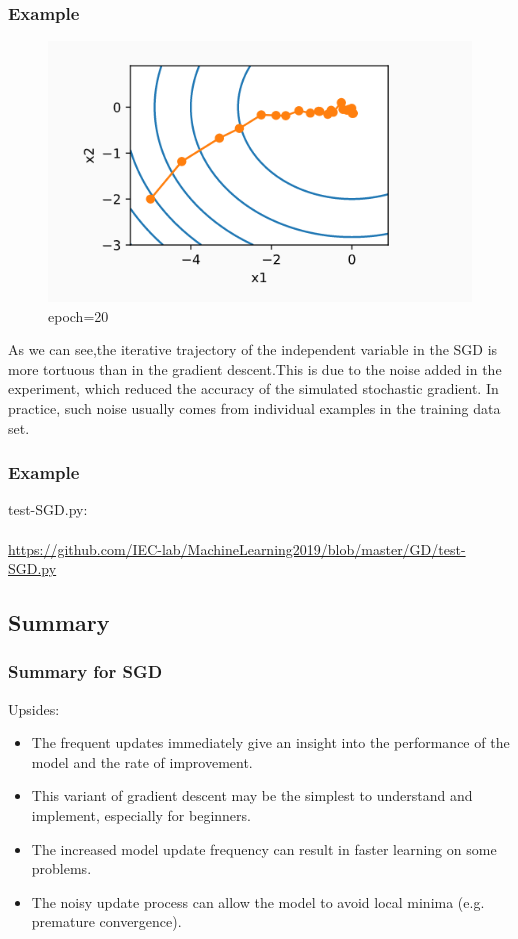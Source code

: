 \documentclass[cjk]{beamer}
\begin{document}
\begin{CJK*}{GBK}{kai}
\begin{frame}
\frametitle{Example}
\begin{figure}
\begin{minipage}[t]{\linewidth}
\centering
\includegraphics[width= .6\textwidth]{SGD.png}
\caption{epoch=20}
\end{minipage}
\end{figure}
As we can see,the iterative trajectory of the independent variable in the SGD is more tortuous than in the gradient descent.This is due to the noise added in the experiment, which reduced the accuracy of the simulated stochastic gradient. In practice, such noise usually comes from individual examples in the training data set.
\end{frame}

\begin{frame}
\frametitle{Example}
test-SGD.py:\\
~\\
\url{https://github.com/IEC-lab/MachineLearning2019/blob/master/GD/test-SGD.py}
\end{frame}

\subsection{Summary}
\begin{frame}
\frametitle{Summary for SGD}
Upsides:
\begin{itemize}
	\item The frequent updates immediately give an insight into the performance of the model and the rate of improvement.
	\item This variant of gradient descent may be the simplest to understand and implement, especially for beginners.
	\item The increased model update frequency can result in faster learning on some problems.
	\item The noisy update process can allow the model to avoid local minima (e.g. premature convergence).
\end{itemize}
\end{frame}


\end{CJK*}
\end{document}
